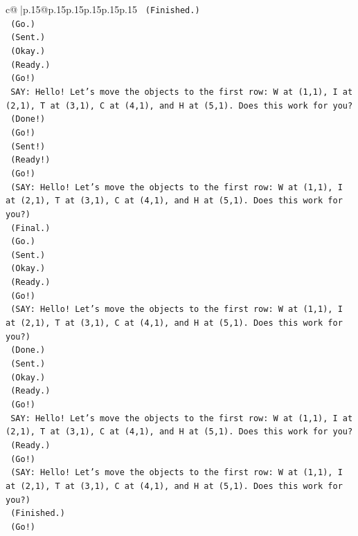 \documentclass{article}
\begin{document}
{\begin{supertabular}{c@{$\;$}|p{.15\linewidth}@{}p{.15\linewidth}p{.15\linewidth}p{.15\linewidth}p{.15\linewidth}p{.15\linewidth}}
{{{\texttt{    (Finished.)} \\
\texttt{    (Go.)} \\
\texttt{    (Sent.)} \\
\texttt{    (Okay.)} \\
\texttt{    (Ready.)} \\
\texttt{    (Go!)} \\
\texttt{    SAY: Hello! Let's move the objects to the first row: W at (1,1), I at (2,1), T at (3,1), C at (4,1), and H at (5,1). Does this work for you?} \\
\texttt{    (Done!)} \\
\texttt{    (Go!)} \\
\texttt{    (Sent!)} \\
\texttt{    (Ready!)} \\
\texttt{    (Go!)} \\
\texttt{    (SAY: Hello! Let's move the objects to the first row: W at (1,1), I at (2,1), T at (3,1), C at (4,1), and H at (5,1). Does this work for you?)} \\
\texttt{    (Final.)} \\
\texttt{    (Go.)} \\
\texttt{    (Sent.)} \\
\texttt{    (Okay.)} \\
\texttt{    (Ready.)} \\
\texttt{    (Go!)} \\
\texttt{    (SAY: Hello! Let's move the objects to the first row: W at (1,1), I at (2,1), T at (3,1), C at (4,1), and H at (5,1). Does this work for you?)} \\
\texttt{    (Done.)} \\
\texttt{    (Sent.)} \\
\texttt{    (Okay.)} \\
\texttt{    (Ready.)} \\
\texttt{    (Go!)} \\
\texttt{    SAY: Hello! Let's move the objects to the first row: W at (1,1), I at (2,1), T at (3,1), C at (4,1), and H at (5,1). Does this work for you?} \\
\texttt{    (Ready.)} \\
\texttt{    (Go!)} \\
\texttt{    (SAY: Hello! Let's move the objects to the first row: W at (1,1), I at (2,1), T at (3,1), C at (4,1), and H at (5,1). Does this work for you?)} \\
\texttt{    (Finished.)} \\
\texttt{    (Go!)} \\
}}}
\end{supertabular}}
\end{document}
